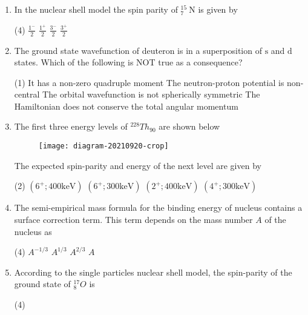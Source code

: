 \begin{enumerate}
	\item In the nuclear shell model the spin parity of ${ }_{7}^{15} \mathrm{~N}$ is given by
	{}
	\begin{tasks}(4)
		\task[\textbf{A.}] $\frac{1^{-}}{2}$
		\task[\textbf{B.}] $\frac{1^{+}}{2}$
		\task[\textbf{C.}] $\frac{3^{-}}{2}$
		\task[\textbf{D.}] $\frac{3^{+}}{2}$
	\end{tasks}
	\item The ground state wavefunction of deuteron is in a superposition of $\mathrm{s}$ and $\mathrm{d}$ states. Which of the following is NOT true as a consequence?
	{}
	\begin{tasks}(1)
		\task[\textbf{A.}]  It has a non-zero quadruple moment
		\task[\textbf{B.}] The neutron-proton potential is non-central
		\task[\textbf{C.}]  The orbital wavefunction is not spherically symmetric
		\task[\textbf{D.}]  The Hamiltonian does not conserve the total angular momentum
	\end{tasks}
	\item The first three energy levels of ${ }^{228} T h_{90}$ are shown below\\
	\begin{figure}[H]
		\centering
		\texttt{[image: diagram-20210920-crop]}
	\end{figure}
	The expected spin-parity and energy of the next level are given by
	{}
	\begin{tasks}(2)
		\task[\textbf{A.}] $\left(6^{+} ; 400 \mathrm{keV}\right)$
		\task[\textbf{B.}] $\left(6^{+} ; 300 \mathrm{keV}\right)$
		\task[\textbf{C.}] $\left(2^{+} ; 400 \mathrm{keV}\right)$
		\task[\textbf{D.}] $\left(4^{+} ; 300 \mathrm{keV}\right)$
	\end{tasks}
	\item The semi-empirical mass formula for the binding energy of nucleus contains a surface correction term. This term depends on the mass number $A$ of the nucleus as
	{}
	\begin{tasks}(4)
		\task[\textbf{A.}] $A^{-1 / 3}$
		\task[\textbf{B.}] $A^{1 / 3}$
		\task[\textbf{C.}]  $A^{2 / 3}$
		\task[\textbf{D.}] $A$
	\end{tasks}
	\item According to the single particles nuclear shell model, the spin-parity of the ground state of ${ }_{8}^{17} O$ is
	{}
	\begin{tasks}(4)

\end{tasks}
\end{enumerate}
